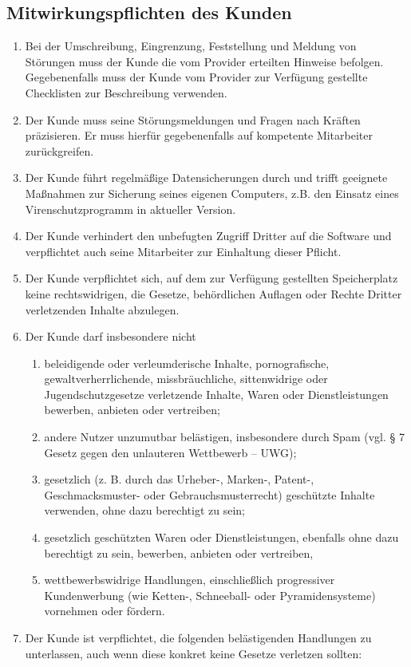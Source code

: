 \documentclass{terms}
\begin{document}
\subsection{Mitwirkungspflichten des Kunden}
\begin{enumerate}
\item Bei der Umschreibung, Eingrenzung, Feststellung und Meldung von Störungen muss der Kunde die vom Provider erteilten Hinweise befolgen. Gegebenenfalls muss der Kunde vom Provider zur Verfügung gestellte Checklisten zur Beschreibung verwenden.
\item Der Kunde muss seine Störungsmeldungen und Fragen nach Kräften präzisieren. Er muss hierfür gegebenenfalls auf kompetente Mitarbeiter zurückgreifen.
\item Der Kunde führt regelmäßige Datensicherungen durch und trifft geeignete Maßnahmen zur Sicherung seines eigenen Computers, z.B. den Einsatz eines Virenschutzprogramm in aktueller Version.
\item Der Kunde verhindert den unbefugten Zugriff Dritter auf die Software und verpflichtet auch seine Mitarbeiter zur Einhaltung dieser Pflicht.
\item Der Kunde verpflichtet sich, auf dem zur Verfügung gestellten Speicherplatz keine rechtswidrigen, die Gesetze, behördlichen Auflagen oder Rechte Dritter verletzenden Inhalte abzulegen. 
\item Der Kunde darf insbesondere nicht \begin{enumerate}
\item beleidigende oder verleumderische Inhalte, pornografische, gewaltverherrlichende, missbräuchliche, sittenwidrige oder Jugendschutzgesetze verletzende Inhalte, Waren oder Dienstleistungen bewerben, anbieten oder vertreiben;
\item andere Nutzer unzumutbar belästigen, insbesondere durch Spam (vgl. § 7 Gesetz gegen den unlauteren Wettbewerb – UWG);
\item gesetzlich (z. B. durch das Urheber-, Marken-, Patent-, Geschmacksmuster- oder Gebrauchsmusterrecht) geschützte Inhalte verwenden, ohne dazu berechtigt zu sein;
\item gesetzlich geschützten Waren oder Dienstleistungen, ebenfalls ohne dazu berechtigt zu sein, bewerben, anbieten oder vertreiben,
\item wettbewerbswidrige Handlungen, einschließlich progressiver Kundenwerbung (wie Ketten-, Schneeball- oder Pyramidensysteme) vornehmen oder fördern.
\end{enumerate}
\item Der Kunde ist verpflichtet, die folgenden belästigenden Handlungen zu unterlassen, auch wenn diese konkret keine Gesetze verletzen sollten: \begin{enumerate}

\end{enumerate}
\end{enumerate}
\end{document}
